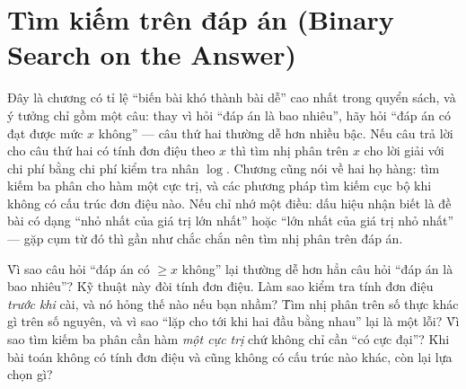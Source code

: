 \documentclass[../../algorithm.tex]{subfiles}
\begin{document}
\chapter{Tìm kiếm trên đáp án (Binary Search on the Answer)}

\begin{tomtat}
Đây là chương có tỉ lệ ``biến bài khó thành bài dễ'' cao nhất trong quyển sách, và ý tưởng chỉ gồm một câu: thay vì hỏi ``đáp án là bao nhiêu'', hãy hỏi ``đáp án có đạt được mức \(x\) không'' --- câu thứ hai thường dễ hơn nhiều bậc. Nếu câu trả lời cho câu thứ hai có tính đơn điệu theo \(x\) thì tìm nhị phân trên \(x\) cho lời giải với chi phí bằng chi phí kiểm tra nhân \(\log\). Chương cũng nói về hai họ hàng: tìm kiếm ba phân cho hàm một cực trị, và các phương pháp tìm kiếm cục bộ khi không có cấu trúc đơn điệu nào. Nếu chỉ nhớ một điều: dấu hiệu nhận biết là đề bài có dạng ``nhỏ nhất của giá trị lớn nhất'' hoặc ``lớn nhất của giá trị nhỏ nhất'' --- gặp cụm từ đó thì gần như chắc chắn nên tìm nhị phân trên đáp án.
\end{tomtat}

\begin{nentang}
\end{nentang}

\begin{khoigoi}
\h{Vì sao câu hỏi ``đáp án có \(\ge x\) không'' lại thường dễ hơn hẳn câu hỏi ``đáp án là bao nhiêu''?}
\h{Kỹ thuật này đòi tính đơn điệu. Làm sao kiểm tra tính đơn điệu \emph{trước khi} cài, và nó hỏng thế nào nếu bạn nhầm?}
\h{Tìm nhị phân trên số thực khác gì trên số nguyên, và vì sao ``lặp cho tới khi hai đầu bằng nhau'' lại là một lỗi?}
\h{Vì sao tìm kiếm ba phân cần hàm \emph{một cực trị} chứ không chỉ cần ``có cực đại''?}
\h{Khi bài toán không có tính đơn điệu và cũng không có cấu trúc nào khác, còn lại lựa chọn gì?}
\end{khoigoi}
\end{document}
